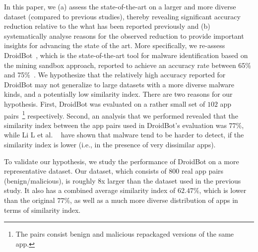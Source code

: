 In this paper, we (a) assess the state-of-the-art on a larger and more diverse dataset (compared to previous studies),
thereby revealing significant accuracy reduction relative to the what has been reported previously and 
(b) systematically analyse reasons for the observed reduction to provide important insights for 
advancing the state of the art.
%
More specifically, we re-assess DroidBot~\cite{DBLP:conf/wcre/BaoLL18,DBLP:journals/jss/CostaMMSSBNR22}, 
which is the state-of-the-art 
tool for malware identification based on the mining sandbox approach,
reported to achieve an accuracy rate between 65\% and 75\%~\cite{DBLP:conf/wcre/BaoLL18,DBLP:journals/jss/CostaMMSSBNR22}. 
 We hypothesize that the relatively high accuracy reported for DroidBot 
may not generalize to large datasets with a more diverse malware kinds, and a potentially low similarity index.
There are two reasons for our hypothesis. First, DroidBot was evaluated on a rather small set of $102$ app pairs~\footnote{The pairs consist benign and malicious repackaged versions of the same app.} respectively. 
Second, an analysis that we performed revealed that the similarity index between the app pairs used in DroidBot's evaluation was $77\%$, while Li L et al. ~\cite{DBLP:journals/tifs/0029LBKTLC17} %
have shown that malware tend to be harder to detect, if the similarity index is lower 
(i.e., in the presence of very dissimilar apps). 

To validate our hypothesis, we study the performance of DroidBot on a more representative dataset. 
Our dataset, which consists of $800$ real app pairs (benign/malicious), is 
roughly 8x larger than the dataset used in the previous study. It also has a combined average similarity index of $62.47\%$, which is lower than the original $77\%$, 
as well as a much more diverse distribution of apps in terms of similarity index.

